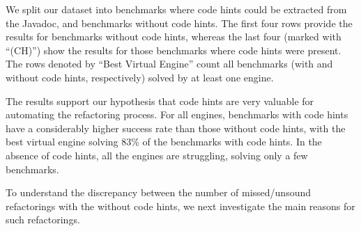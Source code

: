 \documentclass[conference]{IEEEtran}
\begin{document}
We split our dataset into benchmarks where code hints could be extracted from the Javadoc, and benchmarks without code hints.
The first four rows provide the results for benchmarks without code hints, whereas the last four (marked with ``(CH)'') show the results for those
benchmarks where code hints were present. The rows denoted by ``Best Virtual Engine'' count all benchmarks (with and without code hints, respectively)
solved by at least one engine.

The results support our hypothesis that code hints are very valuable for automating the refactoring process.
For all engines, benchmarks with code hints have a considerably higher success rate than those without code hints, with the best virtual
engine solving 83\% of the benchmarks with code hints. In the absence of code hints, all the engines are struggling, solving only a few benchmarks.

To understand the discrepancy between the number of missed/unsound refactorings with the without code hints,
we next investigate the main reasons for such refactorings.




%
%
\end{document}
